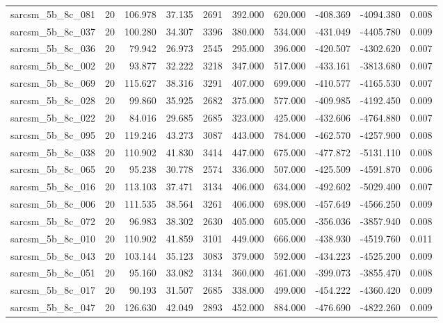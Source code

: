 \begin{tabular}{lrrrrrrrrr}
sarcsm\_5b\_8c\_081 & 20 & 106.978 & 37.135 & 2691 & 392.000 & 620.000 & -408.369 & -4094.380 & 0.008 \\
sarcsm\_5b\_8c\_037 & 20 & 100.280 & 34.307 & 3396 & 380.000 & 534.000 & -431.049 & -4405.780 & 0.009 \\
sarcsm\_5b\_8c\_036 & 20 & 79.942 & 26.973 & 2545 & 295.000 & 396.000 & -420.507 & -4302.620 & 0.007 \\
sarcsm\_5b\_8c\_002 & 20 & 93.877 & 32.222 & 3218 & 347.000 & 517.000 & -433.161 & -3813.680 & 0.007 \\
sarcsm\_5b\_8c\_069 & 20 & 115.627 & 38.316 & 3291 & 407.000 & 699.000 & -410.577 & -4165.530 & 0.007 \\
sarcsm\_5b\_8c\_028 & 20 & 99.860 & 35.925 & 2682 & 375.000 & 577.000 & -409.985 & -4192.450 & 0.009 \\
sarcsm\_5b\_8c\_022 & 20 & 84.016 & 29.685 & 2685 & 323.000 & 425.000 & -432.606 & -4764.880 & 0.007 \\
sarcsm\_5b\_8c\_095 & 20 & 119.246 & 43.273 & 3087 & 443.000 & 784.000 & -462.570 & -4257.900 & 0.008 \\
sarcsm\_5b\_8c\_038 & 20 & 110.902 & 41.830 & 3414 & 447.000 & 675.000 & -477.872 & -5131.110 & 0.008 \\
sarcsm\_5b\_8c\_065 & 20 & 95.238 & 30.778 & 2574 & 336.000 & 507.000 & -425.509 & -4591.870 & 0.006 \\
sarcsm\_5b\_8c\_016 & 20 & 113.103 & 37.471 & 3134 & 406.000 & 634.000 & -492.602 & -5029.400 & 0.007 \\
sarcsm\_5b\_8c\_006 & 20 & 111.535 & 38.564 & 3261 & 406.000 & 698.000 & -457.649 & -4566.250 & 0.009 \\
sarcsm\_5b\_8c\_072 & 20 & 96.983 & 38.302 & 2630 & 405.000 & 605.000 & -356.036 & -3857.940 & 0.008 \\
sarcsm\_5b\_8c\_010 & 20 & 110.902 & 41.859 & 3101 & 449.000 & 666.000 & -438.930 & -4519.760 & 0.011 \\
sarcsm\_5b\_8c\_043 & 20 & 103.144 & 35.123 & 3083 & 379.000 & 592.000 & -434.223 & -4525.200 & 0.009 \\
sarcsm\_5b\_8c\_051 & 20 & 95.160 & 33.082 & 3134 & 360.000 & 461.000 & -399.073 & -3855.470 & 0.008 \\
sarcsm\_5b\_8c\_017 & 20 & 90.193 & 31.507 & 2685 & 338.000 & 499.000 & -454.222 & -4360.420 & 0.009 \\
sarcsm\_5b\_8c\_047 & 20 & 126.630 & 42.049 & 2893 & 452.000 & 884.000 & -476.690 & -4822.260 & 0.009 \\

\end{tabular}
